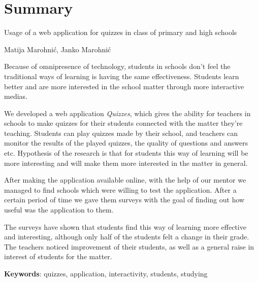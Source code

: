 \documentclass[11pt]{scrreprt}
\begin{document}
\chapter{Summary}

Usage of a web application for quizzes in class of primary and high schools

Matija Marohnić, Janko Marohnić

Because of omnipresence of technology, students in schools don't feel the
traditional ways of learning is having the same effectiveness. Students learn
better and are more interested in the school matter through more interactive
medias.

We developed a web application \textit{Quizzes}, which gives the ability for
teachers in schools to make quizzes for their students connected with the
matter they're teaching. Students can play quizzes made by their school, and
teachers can monitor the results of the played quizzes, the quality of
questions and answers etc. Hypothesis of the research is that for students this
way of learning will be more interesting and will make them more interested in
the matter in general.

After making the application available online, with the help of our mentor we
managed to find schools which were willing to test the application. After a
certain period of time we gave them surveys with the goal of finding out how
useful was the application to them.

The surveys have shown that students find this way of learning more effective
and interesting, although only half of the students felt a change in their
grade. The teachers noticed improvement of their students, as well as a general
raise in interest of students for the matter.

\textbf{Keywords}: quizzes, application, interactivity, students, studying
\end{document}
